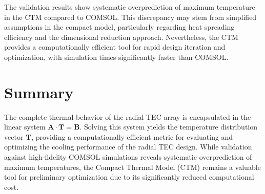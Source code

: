 \documentclass[10pt,a4paper,twocolumn]{article}
\newenvironment{customnote}[1][]{
    \begin{tcolorbox}[NoteBox, #1]
}{
    \end{tcolorbox}
}
\begin{document}
\begin{customnote}
	The validation results show systematic overprediction of maximum temperature in the CTM compared to COMSOL. This discrepancy may stem from simplified assumptions in the compact model, particularly regarding heat spreading efficiency and the dimensional reduction approach. Nevertheless, the CTM provides a computationally efficient tool for rapid design iteration and optimization, with simulation times significantly faster than COMSOL.
\end{customnote}

\section{Summary}

The complete thermal behavior of the radial TEC array is encapsulated in the linear system $\mathbf{A} \cdot \mathbf{T} = \mathbf{B}$. Solving this system yields the temperature distribution vector $\mathbf{T}$, providing a computationally efficient metric for evaluating and optimizing the cooling performance of the radial TEC design. While validation against high-fidelity COMSOL simulations reveals systematic overprediction of maximum temperatures, the Compact Thermal Model (CTM) remains a valuable tool for preliminary optimization due to its significantly reduced computational cost.
\end{document}
